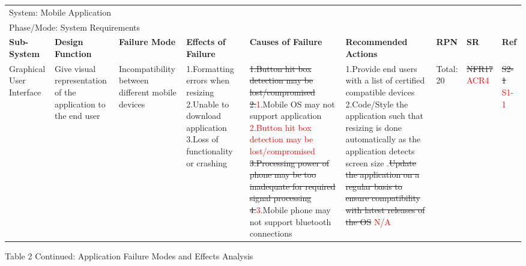 \documentclass[12pt, titlepage]{article}
\begin{document}
\begin{landscape}
\begin{table}[H]
\begin{tabular}{| p{} | p{}  | p{} | p{} | p{} | p{} | p{} | p{} | p{} |}
    \multicolumn{9}{|l|}{System: Mobile Application } \\
    \multicolumn{9}{|l|}{Phase/Mode: System Requirements} \\ \hline
    \textbf{Sub-System} & \textbf{Design Function} & \textbf{Failure Mode} & \textbf{Effects of Failure} & \textbf{Causes of Failure} & \textbf{Recommended Actions} & \textbf{RPN} & \textbf{SR} & \textbf{Ref} \\ \hline

    Graphical User Interface & Give visual representation of the application to the end user & Incompatibility between different mobile devices  & 1.Formatting errors when resizing \newline 2.Unable to download application \newline 3.Loss of functionality or crashing & \sout{1.Button hit box detection may be lost/compromised} \newline \sout{2.}\textcolor{red}{1.}Mobile OS may not support application \newline \textcolor{red}{2.Button hit box detection may be lost/compromised} \sout{3.Processing power of phone may be too  inadequate for required signal processing} \newline \sout{4.}\textcolor{red}{3.}Mobile phone may not support bluetooth connections  & 1.Provide end users with a list of certified compatible devices \newline 2.Code/Style the application such that resizing is done automatically as the application detects screen size \newline 3.\sout{Update the application on a regular basis to ensure compatibility with latest releases of the OS} \textcolor{red}{N/A}   & Total: 20 & \sout{NFR17} \textcolor{red}{ACR4} & \sout{S2-1} \textcolor{red}{S1-1} \\ \cline{1-9}

    \end{tabular}
    
\end{table}

\begin{table}[H]

    Table 2 Continued: Application Failure Modes and Effects Analysis	
    \centering
    
    \begin{tabular}{| p{} | p{}  | p{} | p{} | p{} | p{} | p{} | p{} | p{} |}
     \hline
    

\end{tabular}
\end{table}
\end{landscape}
\end{document}

